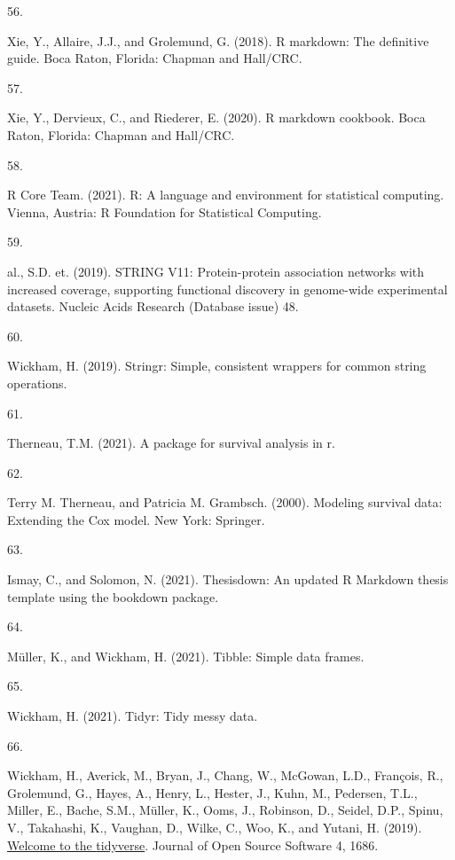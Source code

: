 \documentclass[
]{article}
\newlength{\cslhangindent}
\newlength{\csllabelwidth}
\newlength{\cslentryspacingunit} %
\newenvironment{CSLReferences}[2] %
 {%
  \setlength{\parindent}{0pt}
  \ifodd #1
  \let\oldpar\par
  \def\par{\hangindent=\cslhangindent\oldpar}
  \fi
  \setlength{\parskip}{#2\cslentryspacingunit}
 }%
 {}
\newcommand{\CSLLeftMargin}[1]{\parbox[t]{\csllabelwidth}{#1}}
\newcommand{\CSLRightInline}[1]{\parbox[t]{\linewidth - \csllabelwidth}{#1}\break}
\begin{document}
\begin{CSLReferences}{0}{0}
\leavevmode{}%
\CSLLeftMargin{56. }
\CSLRightInline{Xie, Y., Allaire, J.J., and Grolemund, G. (2018). R markdown: {The} definitive guide. {Boca Raton, Florida}: {Chapman and Hall/CRC}.}

\leavevmode{}%
\CSLLeftMargin{57. }
\CSLRightInline{Xie, Y., Dervieux, C., and Riederer, E. (2020). R markdown cookbook. {Boca Raton, Florida}: {Chapman and Hall/CRC}.}

\leavevmode{}%
\CSLLeftMargin{58. }
\CSLRightInline{R Core Team. (2021). R: {A} language and environment for statistical computing. {Vienna, Austria}: {R Foundation for Statistical Computing}.}

\leavevmode{}%
\CSLLeftMargin{59. }
\CSLRightInline{al., S.D. et. (2019). {STRING} V11: Protein-protein association networks with increased coverage, supporting functional discovery in genome-wide experimental datasets. Nucleic Acids Research (Database issue) 48.}

\leavevmode{}%
\CSLLeftMargin{60. }
\CSLRightInline{Wickham, H. (2019). Stringr: {Simple}, consistent wrappers for common string operations.}

\leavevmode{}%
\CSLLeftMargin{61. }
\CSLRightInline{Therneau, T.M. (2021). A package for survival analysis in r.}

\leavevmode{}%
\CSLLeftMargin{62. }
\CSLRightInline{Terry M. Therneau, and Patricia M. Grambsch. (2000). Modeling survival data: {Extending} the {Cox} model. {New York}: {Springer}.}

\leavevmode{}%
\CSLLeftMargin{63. }
\CSLRightInline{Ismay, C., and Solomon, N. (2021). Thesisdown: {An} updated {R Markdown} thesis template using the bookdown package.}

\leavevmode{}%
\CSLLeftMargin{64. }
\CSLRightInline{Müller, K., and Wickham, H. (2021). Tibble: {Simple} data frames.}

\leavevmode{}%
\CSLLeftMargin{65. }
\CSLRightInline{Wickham, H. (2021). Tidyr: {Tidy} messy data.}

\leavevmode{}%
\CSLLeftMargin{66. }
\CSLRightInline{Wickham, H., Averick, M., Bryan, J., Chang, W., McGowan, L.D., François, R., Grolemund, G., Hayes, A., Henry, L., Hester, J., Kuhn, M., Pedersen, T.L., Miller, E., Bache, S.M., Müller, K., Ooms, J., Robinson, D., Seidel, D.P., Spinu, V., Takahashi, K., Vaughan, D., Wilke, C., Woo, K., and Yutani, H. (2019). \href{https://doi.org/10.21105/joss.01686}{Welcome to the {tidyverse}}. Journal of Open Source Software 4, 1686.}


\end{CSLReferences}
\end{document}
